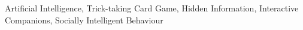 \begin{resumo}


\end{resumo}

\begin{palavraschave}
Artificial Intelligence, Trick-taking Card Game, Hidden Information, Interactive Companions, Socially Intelligent Behaviour
\end{palavraschave}

\clearpage
\thispagestyle{empty}
\cleardoublepage